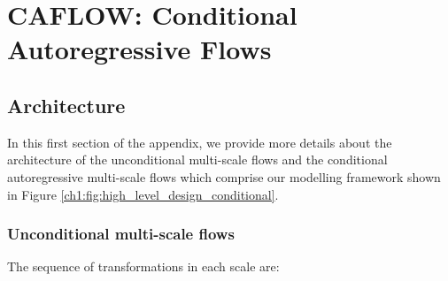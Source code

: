
\chapter{CAFLOW: Conditional Autoregressive Flows}  %
\section{Architecture}

In this first section of the appendix, we provide more details about the architecture of the unconditional multi-scale flows and the conditional autoregressive multi-scale flows which comprise our modelling framework shown in Figure \ref{ch1:fig:high_level_design_conditional}.

\subsection{Unconditional multi-scale flows}\label{ch1:unconditional-architecture}
The sequence of transformations in each scale are:

